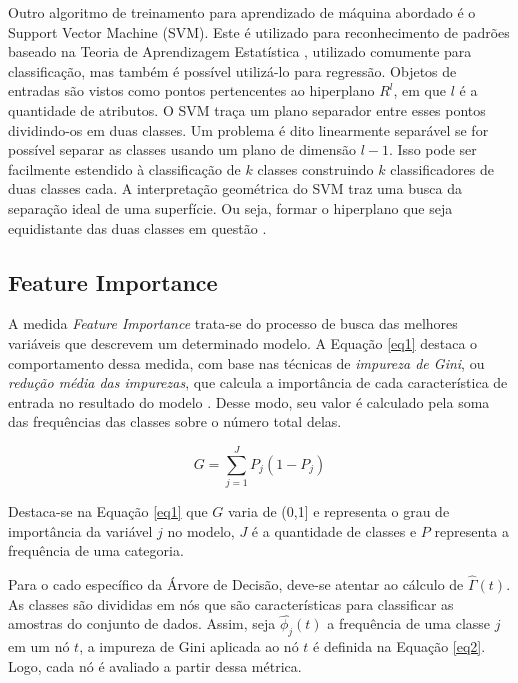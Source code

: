 \documentclass{template/sig-alternate-05-2015}
\begin{document}
    Outro algoritmo de treinamento para aprendizado de máquina
    abordado é o Support Vector Machine (SVM). Este é utilizado para
    reconhecimento de padrões baseado na Teoria de Aprendizagem
    Estatística \cite{samsudin2010hybrid}, utilizado comumente para
    classificação, mas também é possível utilizá-lo para
    regressão. Objetos de entradas são vistos como pontos pertencentes
    ao hiperplano $R^l$, em que $l$ é a quantidade de atributos. O SVM
    traça um plano separador entre esses pontos dividindo-os em duas
    classes. Um problema é dito linearmente separável se for possível
    separar as classes usando um plano de dimensão $l-1$. Isso pode
    ser facilmente estendido à classificação de $k$ classes
    construindo $k$ classificadores de duas classes cada. A
    interpretação geométrica do SVM traz uma busca da separação ideal
    de uma superfície. Ou seja, formar o hiperplano que seja
    equidistante das duas classes em questão \cite{Talabani:2018}.

    \subsection{Feature Importance}

    A medida \textit{Feature Importance} trata-se do processo de busca
    das melhores variáveis que descrevem um determinado modelo. A
    Equação \ref{eq1} destaca o comportamento dessa medida, com base
    nas técnicas de \textit{impureza de Gini}, ou \textit{redução
      média das impurezas}, que calcula a importância de cada
    característica de entrada no resultado do modelo
    \cite{IEEE}. Desse modo, seu valor é calculado pela soma das
    frequências das classes sobre o número total delas.

    \begin{equation}
      \textit{G} = \sum_{j=1}^J P_j(1 - P_j)\label{eq1}
    \end{equation}

    Destaca-se na Equação \ref{eq1} que $G$ varia de (0,1] e
    representa o grau de importância da variável $j$ no modelo, $J$ é
    a quantidade de classes e $P$ representa a frequência de uma
    categoria.

    Para o cado específico da Árvore de Decisão, deve-se atentar ao
    cálculo de $\hat{\Gamma}(t)$. As classes são divididas em nós que são
    características para classificar as amostras do conjunto de
    dados. Assim, seja $\hat{\phi_j}(t)$ a frequência de uma classe
    $j$ em um nó $t$, a impureza de Gini \cite{Mach} aplicada ao nó
    $t$ é definida na Equação \ref{eq2}. Logo, cada nó é avaliado a
    partir dessa métrica.
\end{document}
